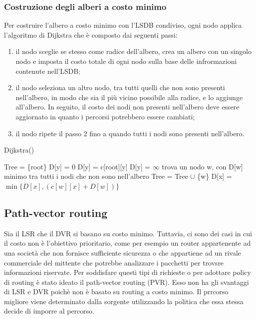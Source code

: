 \documentclass[12pt]{report}
\begin{document}
\subsubsection{Costruzione degli alberi a costo minimo}
Per costruire l'albero a costo minimo con l'LSDB condiviso, ogni nodo applica l'algoritmo di Dijkstra che è composto dai seguenti passi:
\begin{enumerate}
	\item il nodo sceglie se stesso come radice dell'albero, crea un albero con un singolo nodo e imposta il costo totale di ogni nodo sulla base delle infrormazioni contenute nell'LSDB;
	\item il nodo seleziona un altro nodo, tra tutti quelli che non sono presenti nell'albero, in modo che sia il più vicino possibile alla radice, e lo aggiunge all'albero. In seguito, il costo dei nodi non presenti nell'albero deve essere aggiornato in quanto i percorsi potrebbero essere cambiati;
	\item il nodo ripete il passo 2 fino a quando tutti i nodi sono presenti nell'albero.
\end{enumerate}
\begin{algorithm}[h]
	\caption{Dijkstra()}
	\begin{algorithmic}
		\State Tree = \{root\}
				\State D[y] = 0
				\State D[y] = c[root][y]
			\Else
				\State D[y] = $\infty$
			\EndIf
		\EndFor
		\Repeat
			\State trova un nodo w, con D[w] minimo tra tutti i nodi che non sono nell'albero
			\State Tree = Tree $\cup$ \{w\}
				\State D[x] = $\min\{ D[x], (c[w][x] + D[w]) \}$
			\EndFor
	\end{algorithmic}
\end{algorithm}

\subsection{Path-vector routing}
Sia il LSR che il DVR si basano su costo minimo. Tuttavia, ci sono dei casi in cui il costo non è l'obiettivo prioritario, come per esempio un router appartenente ad una società che non fornisce sufficiente sicurezza o che appartiene ad un rivale commerciale del mittente che potrebbe analizzare i pacchetti per trovsre informazioni riservate. Per soddisfare questi tipi di richieste o per adottare policy di routing è stato ideato il path-vector routing (PVR). Esso non ha gli svantaggi di LSR e DVR poichè non è basato su routing a costo minimo. Il prrcorso migliore viene determinato dalla sorgente utilizzando la politica che essa stessa decide di imporre al percorso.
\end{document}
